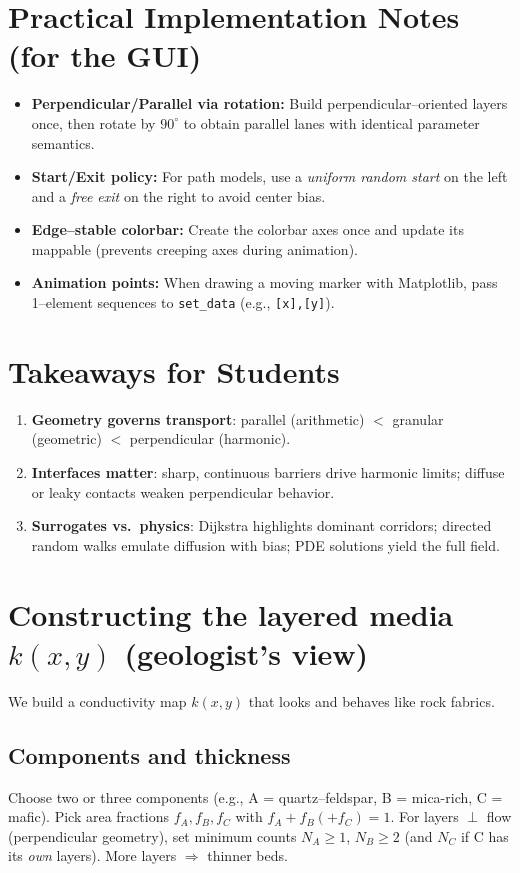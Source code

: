 \documentclass[11pt,a4paper]{article}
\begin{document}
\section{Practical Implementation Notes (for the GUI)}
\begin{itemize}
  \item \textbf{Perpendicular/Parallel via rotation:} Build perpendicular--oriented layers once, then rotate by $90^\circ$ to obtain parallel lanes with identical parameter semantics.
  \item \textbf{Start/Exit policy:} For path models, use a \emph{uniform random start} on the left and a \emph{free exit} on the right to avoid center bias.
  \item \textbf{Edge--stable colorbar:} Create the colorbar axes once and update its mappable (prevents creeping axes during animation).
  \item \textbf{Animation points:} When drawing a moving marker with Matplotlib, pass 1--element sequences to \verb|set_data| (e.g., \verb|[x],[y]|).
\end{itemize}

\section*{Takeaways for Students}
\begin{enumerate}
  \item \textbf{Geometry governs transport}: parallel (arithmetic) $<$ granular (geometric) $<$ perpendicular (harmonic).
  \item \textbf{Interfaces matter}: sharp, continuous barriers drive harmonic limits; diffuse or leaky contacts weaken perpendicular behavior.
  \item \textbf{Surrogates vs.\ physics}: Dijkstra highlights dominant corridors; directed random walks emulate diffusion with bias; PDE solutions yield the full field.
\end{enumerate}




\section{Constructing the layered media $k(x,y)$ (geologist's view)}
We build a conductivity map $k(x,y)$ that looks and behaves like rock fabrics.

\subsection*{Components and thickness}
Choose two or three components (e.g., A = quartz--feldspar, B = mica-rich, C = mafic). Pick area fractions $f_A, f_B, f_C$ with $f_A+f_B(+f_C)=1$. For layers $\perp$ flow (perpendicular geometry), set minimum counts $N_A\!\ge\!1$, $N_B\!\ge\!2$ (and $N_C$ if C has its \emph{own} layers). More layers $\Rightarrow$ thinner beds.
\end{document}
